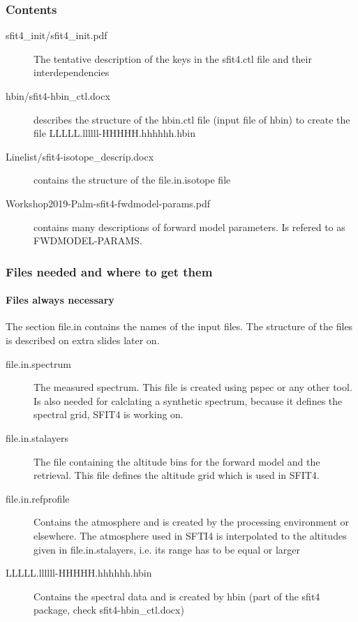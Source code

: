 \documentclass[notes=hide]{beamer}
\begin{document}
\begin{frame}
  \frametitle{Contents}
  \begin{description}
  \item[sfit4\_init/sfit4\_init.pdf] The tentative description of the
    keys in the sfit4.ctl file and their interdependencies
  \item[hbin/sfit4-hbin\_ctl.docx] describes the structure of the
    hbin.ctl file (input file of hbin) to create the file
    LLLLL.llllll-HHHHH.hhhhhh.hbin
  \item[Linelist/sfit4-isotope\_descrip.docx] contains the structure of
    the file.in.isotope file 
\item[Workshop2019-Palm-sfit4-fwdmodel-params.pdf] contains many
  descriptions of forward model parameters. Is refered to as FWDMODEL-PARAMS.
  \end{description}
\end{frame}



\begin{frame}
  \frametitle{Files needed and where to get them}
  \framesubtitle{Files always necessary}
  The section file.in
  contains the names of the input files. The structure of the files is
  described on extra slides later on.
  \begin{description}
  \item[file.in.spectrum] The measured spectrum. This file is created
    using pspec or any other tool. Is also needed for calclating a
    synthetic spectrum, because it defines the spectral grid, SFIT4 is
    working on.
  \item[file.in.stalayers] The file containing the altitude bins for
    the forward model and the retrieval. This file defines the
    altitude grid which is used in SFIT4.
  \item[file.in.refprofile] Contains the atmosphere and is created by
    the processing environment or elsewhere. The atmosphere used in
    SFTI4 is interpolated to the altitudes given in file.in.stalayers,
    i.e. its range has to be equal or larger
  \item[LLLLL.llllll-HHHHH.hhhhhh.hbin] Contains the spectral data and
    is created by hbin (part of the sfit4 package, check sfit4-hbin\_ctl.docx)
  \end{description}
\end{frame}
\end{document}
